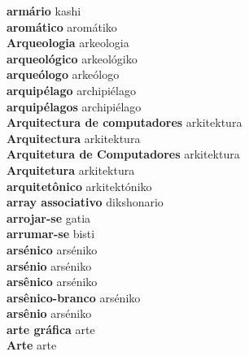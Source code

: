 \textbf{ armário  } kashi \\
\textbf{ aromático  } aromátiko \\
\textbf{ Arqueologia  } arkeologia \\
\textbf{ arqueológico  } arkeológiko \\
\textbf{ arqueólogo  } arkeólogo \\
\textbf{ arquipélago  } archipiélago \\
\textbf{ arquipélagos  } archipiélago \\
\textbf{ Arquitectura de computadores  } arkitektura \\
\textbf{ Arquitectura  } arkitektura \\
\textbf{ Arquitetura de Computadores  } arkitektura \\
\textbf{ Arquitetura  } arkitektura \\
\textbf{ arquitetônico  } arkitektóniko \\
\textbf{ array associativo  } dikshonario \\
\textbf{ arrojar-se  } gatia \\
\textbf{ arrumar-se  } bisti \\
\textbf{ arsénico  } arséniko \\
\textbf{ arsénio  } arséniko \\
\textbf{ arsênico  } arséniko \\
\textbf{ arsênico-branco  } arséniko \\
\textbf{ arsênio  } arséniko \\
\textbf{ arte gráfica  } arte \\
\textbf{ Arte  } arte \\
